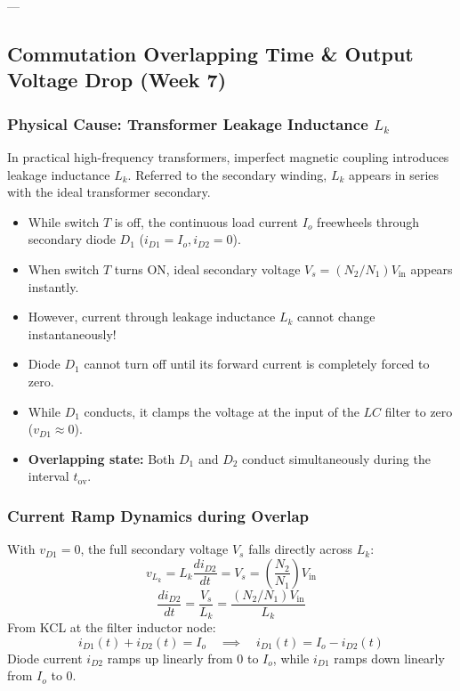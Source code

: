 ---

\subsection{Commutation Overlapping Time \& Output Voltage Drop (Week 7)}

\subsubsection{Physical Cause: Transformer Leakage Inductance $L_k$}
In practical high-frequency transformers, imperfect magnetic coupling introduces leakage inductance $L_k$. Referred to the secondary winding, $L_k$ appears in series with the ideal transformer secondary.
\begin{itemize}
  \item While switch $T$ is off, the continuous load current $I_o$ freewheels through secondary diode $D_1$ ($i_{D1} = I_o, i_{D2} = 0$).
  \item When switch $T$ turns ON, ideal secondary voltage $V_s = (N_2/N_1) V_{\mathrm{in}}$ appears instantly.
  \item However, current through leakage inductance $L_k$ cannot change instantaneously!
  \item Diode $D_1$ cannot turn off until its forward current is completely forced to zero.
  \item While $D_1$ conducts, it clamps the voltage at the input of the $LC$ filter to zero ($v_{D1} \approx 0$).
  \item \textbf{Overlapping state:} Both $D_1$ and $D_2$ conduct simultaneously during the interval $t_{\mathrm{ov}}$.
\end{itemize}

\subsubsection{Current Ramp Dynamics during Overlap}
With $v_{D1} = 0$, the full secondary voltage $V_s$ falls directly across $L_k$:
\[
v_{L_k} = L_k \frac{di_{D2}}{dt} = V_s = \left(\frac{N_2}{N_1}\right) V_{\mathrm{in}}
\]
\begin{equation}
\frac{di_{D2}}{dt} = \frac{V_s}{L_k} = \frac{(N_2/N_1) V_{\mathrm{in}}}{L_k}
\end{equation}
From KCL at the filter inductor node:
\[
i_{D1}(t) + i_{D2}(t) = I_o \quad\implies\quad i_{D1}(t) = I_o - i_{D2}(t)
\]
Diode current $i_{D2}$ ramps up linearly from $0$ to $I_o$, while $i_{D1}$ ramps down linearly from $I_o$ to $0$.


